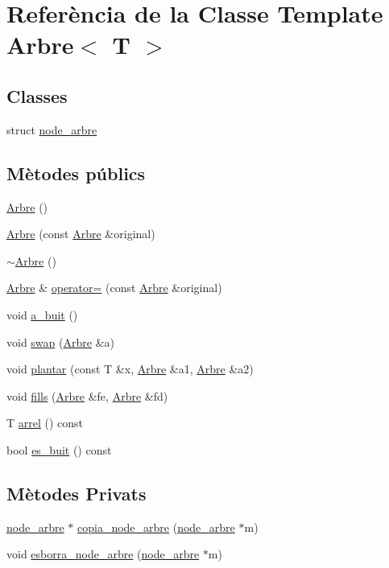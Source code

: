 \hypertarget{class_arbre}{\section{Referència de la Classe Template Arbre$<$ T $>$}
\label{class_arbre}
}
\subsection*{Classes}
\begin{DoxyCompactItemize}
\item 
struct \hyperlink{struct_arbre_1_1node__arbre}{node\-\_\-arbre}
\end{DoxyCompactItemize}
\subsection*{Mètodes públics}
\begin{DoxyCompactItemize}
\item 
\hyperlink{class_arbre_a3f613426983169266297eb841996845e}{Arbre} ()
\item 
\hyperlink{class_arbre_a8f8615c19988334f9b77dc51f44acc6d}{Arbre} (const \hyperlink{class_arbre}{Arbre} \&original)
\item 
\hyperlink{class_arbre_a13cfb8184d9c43d92584d434243c7b3d}{$\sim$\-Arbre} ()
\item 
\hyperlink{class_arbre}{Arbre} \& \hyperlink{class_arbre_a58314b830f6f3ba0e598e352513a87c5}{operator=} (const \hyperlink{class_arbre}{Arbre} \&original)
\item 
void \hyperlink{class_arbre_aa74ec0d2b601487b822eb70100330582}{a\-\_\-buit} ()
\item 
void \hyperlink{class_arbre_a931d1c91e9fd6cbe72703a7ba7d40415}{swap} (\hyperlink{class_arbre}{Arbre} \&a)
\item 
void \hyperlink{class_arbre_a806d45f6f1d3a9dd357563979186f721}{plantar} (const T \&x, \hyperlink{class_arbre}{Arbre} \&a1, \hyperlink{class_arbre}{Arbre} \&a2)
\item 
void \hyperlink{class_arbre_aee75355cee7599e132de75781d26a61d}{fills} (\hyperlink{class_arbre}{Arbre} \&fe, \hyperlink{class_arbre}{Arbre} \&fd)
\item 
T \hyperlink{class_arbre_aa6e2559ead7dfceda962cff11fb1a15c}{arrel} () const 
\item 
bool \hyperlink{class_arbre_a68a51f6689f0b2889e8e1d56266fd620}{es\-\_\-buit} () const 
\end{DoxyCompactItemize}
\subsection*{Mètodes Privats}
\begin{DoxyCompactItemize}
\item 
\hyperlink{struct_arbre_1_1node__arbre}{node\-\_\-arbre} $\ast$ \hyperlink{class_arbre_a8562c3574c0037eae30a6d04050fb517}{copia\-\_\-node\-\_\-arbre} (\hyperlink{struct_arbre_1_1node__arbre}{node\-\_\-arbre} $\ast$m)
\item 
void \hyperlink{class_arbre_ab97c98d266a5b8973fe2519c14cf362a}{esborra\-\_\-node\-\_\-arbre} (\hyperlink{struct_arbre_1_1node__arbre}{node\-\_\-arbre} $\ast$m)
\end{DoxyCompactItemize}
